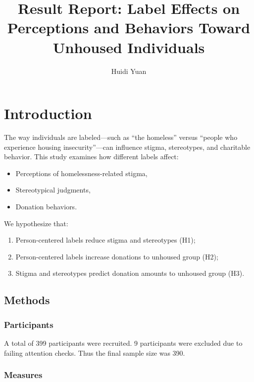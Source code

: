 \documentclass[
  man,
  floatsintext,
  longtable,
  nolmodern,
  notxfonts,
  notimes,
  colorlinks=true,linkcolor=blue,citecolor=blue,urlcolor=blue]{apa7}
\title{Result Report: Label Effects on Perceptions and Behaviors Toward
Unhoused Individuals}
\author{Huidi Yuan}
\affiliation{
{University of Chicago}}
\providecommand{\tightlist}{%
  \setlength{\itemsep}{0pt}\setlength{\parskip}{0pt}}
\begin{document}
\maketitle


\setcounter{secnumdepth}{-\maxdimen} %

\setlength\LTleft{0pt}


\section{Introduction}\label{introduction}

The way individuals are labeled---such as ``the homeless'' versus
``people who experience housing insecurity''---can influence stigma,
stereotypes, and charitable behavior. This study examines how different
labels affect:

\begin{itemize}
\tightlist
\item
  Perceptions of homelessness-related stigma,
\item
  Stereotypical judgments,
\item
  Donation behaviors.
\end{itemize}

We hypothesize that:

\begin{enumerate}
\def\labelenumi{\arabic{enumi}.}
\tightlist
\item
  Person-centered labels reduce stigma and stereotypes (H1);
\item
  Person-centered labels increase donations to unhoused group (H2);
\item
  Stigma and stereotypes predict donation amounts to unhoused group
  (H3).
\end{enumerate}

\subsection{Methods}\label{methods}

\subsubsection{Participants}\label{participants}

A total of 399 participants were recruited. 9 participants were excluded
due to failing attention checks. Thus the final sample size was 390.

\subsubsection{Measures}\label{measures}
\end{document}
